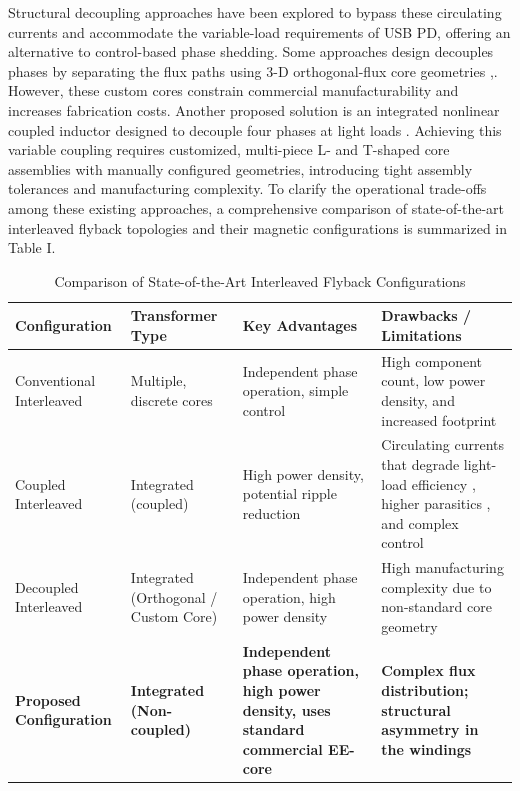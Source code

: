\documentclass[lettersize,journal]{IEEEtran}
\begin{document}
Structural decoupling approaches have been explored to bypass these circulating currents and accommodate the variable-load requirements of USB PD, offering an alternative to control-based phase shedding. Some approaches design decouples phases by separating the flux paths using  3-D orthogonal-flux core geometries \cite{Ouyang},\cite{fayyaz2025}. However, these custom cores constrain commercial manufacturability and increases fabrication costs. Another proposed solution is an integrated nonlinear coupled inductor designed to decouple four phases at light loads \cite{Z_Li_2025}. Achieving this variable coupling requires customized, multi-piece L- and T-shaped core assemblies with manually configured geometries, introducing tight assembly tolerances and manufacturing complexity. To clarify the operational trade-offs among these existing approaches, a comprehensive comparison of state-of-the-art interleaved flyback topologies and their magnetic configurations is summarized in Table I.

\begin{table}[b!]
    \caption{Comparison of State-of-the-Art Interleaved Flyback Configurations}
    \centering
    \footnotesize
    \begin{tabular}{l m{4cm} m{4.5cm} m{4.5cm}}
        \hline
        \textbf{Configuration} & \textbf{Transformer Type} & \textbf{Key Advantages} & \textbf{Drawbacks / Limitations} \\
        \hline \hline
        Conventional Interleaved & Multiple, discrete cores \cite{shi2024, cheng2018, wu2015, cheng2023, mayer2025} & Independent phase operation, simple control & High component count, low power density, and increased footprint \\
        Coupled Interleaved & Integrated (coupled) \cite{ishihara2015, tonolo2025, qian2008} & High power density, potential ripple reduction & Circulating currents that degrade light-load efficiency \cite{Yang_2020, Z_Li_2025}, higher parasitics \cite{meng2021, kwon2024}, and complex control \cite{Mao_2011} \\
        Decoupled Interleaved & Integrated (Orthogonal / Custom Core) \cite{Z_Li_2025, Ouyang, fayyaz2025} & Independent phase operation, high power density & High manufacturing complexity due to non-standard core geometry \\
        \textbf{Proposed Configuration} & \textbf{Integrated (Non-coupled)} & \textbf{Independent phase operation, high power density, uses standard commercial EE-core} & \textbf{Complex flux distribution; structural asymmetry in the windings} \\
        \hline
    \end{tabular}
    \label{tab:literature_comparison}
\end{table}
\end{document}
